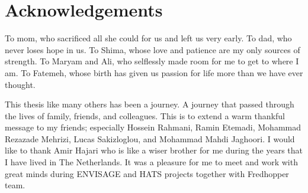 %
\chapter*{Acknowledgements}
\label{sec:acknowledgement}
\vspace*{-10mm}

To mom, who sacrificed all she could for us and left us very early.
To dad, who never loses hope in us.
To Shima, whose love and patience are my only sources of strength.
To Maryam and Ali, who selflessly made room for me to get to where I am.
To Fatemeh, whose birth has given us passion for life more than we have ever thought.

This thesis like many others has been a journey.
A journey that passed through the lives of family, friends, and colleagues.
This is to extend a warm thankful message to my friends; especially
Hossein Rahmani, Ramin Etemadi, Mohammad Rezazade Mehrizi, Lucas Sakizloglou,
and Mohammad Mahdi Jaghoori.
I would like to thank Amir Hajari who is like a wiser brother 
for me during the years that I have lived in The Netherlands.
It was a pleasure for me to meet and work with great minds during
ENVISAGE and HATS projects together with Fredhopper team.
